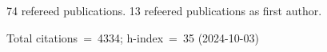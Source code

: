 74 refereed publications. 13 refeered publications as first author.

Total citations~=~4334; h-index~=~35 (2024-10-03)